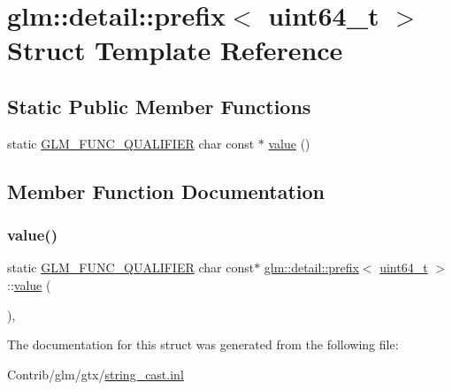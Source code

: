 \hypertarget{structglm_1_1detail_1_1prefix_3_01uint64__t_01_4}{}\section{glm\+:\+:detail\+:\+:prefix$<$ uint64\+\_\+t $>$ Struct Template Reference}
\label{structglm_1_1detail_1_1prefix_3_01uint64__t_01_4}
\subsection*{Static Public Member Functions}
\begin{DoxyCompactItemize}
\item 
static \mbox{\hyperlink{setup_8hpp_a33fdea6f91c5f834105f7415e2a64407}{G\+L\+M\+\_\+\+F\+U\+N\+C\+\_\+\+Q\+U\+A\+L\+I\+F\+I\+ER}} char const  $\ast$ \mbox{\hyperlink{structglm_1_1detail_1_1prefix_3_01uint64__t_01_4_a70571c67b5d9aadad2b0d3ea937fa392}{value}} ()
\end{DoxyCompactItemize}


\subsection{Member Function Documentation}
\mbox{\label{structglm_1_1detail_1_1prefix_3_01uint64__t_01_4_a70571c67b5d9aadad2b0d3ea937fa392}} 
\subsubsection{\texorpdfstring{value()}{value()}}
{\footnotesize\ttfamily static \mbox{\hyperlink{setup_8hpp_a33fdea6f91c5f834105f7415e2a64407}{G\+L\+M\+\_\+\+F\+U\+N\+C\+\_\+\+Q\+U\+A\+L\+I\+F\+I\+ER}} char const$\ast$ \mbox{\hyperlink{structglm_1_1detail_1_1prefix}{glm\+::detail\+::prefix}}$<$ \mbox{\hyperlink{group__gtc__type__precision_ga058f57c19e1befdcf12498944bd73e69}{uint64\+\_\+t}} $>$\+::\mbox{\hyperlink{_s_d_l__opengl__glext_8h_a8ad81492d410ff2ac11f754f4042150f}{value}} (\begin{DoxyParamCaption}{ }\end{DoxyParamCaption})\hspace{0.3cm}{\ttfamily [inline]}, {\ttfamily [static]}}



The documentation for this struct was generated from the following file\+:\begin{DoxyCompactItemize}
\item 
Contrib/glm/gtx/\mbox{\hyperlink{string__cast_8inl}{string\+\_\+cast.\+inl}}\end{DoxyCompactItemize}
